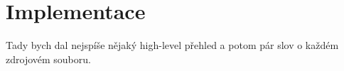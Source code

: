 \chapter{Implementace}

Tady bych dal nejspíše nějaký high-level přehled a potom pár slov o každém zdrojovém souboru.
